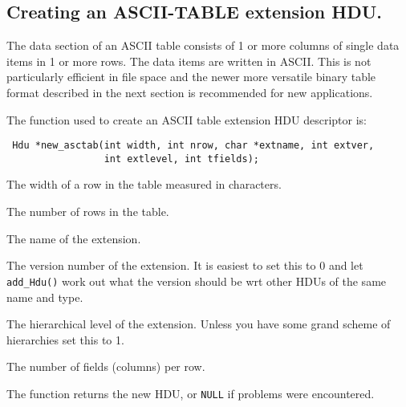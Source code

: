\subsection{Creating an ASCII-TABLE extension HDU.}

The data section of an ASCII table consists of 1 or more columns of
single data items in 1 or more rows. The data items are written in
ASCII. This is not particularly efficient in file space and the newer
more versatile binary table format described in the next section is
recommended for new applications.

The function used to create an ASCII table extension HDU descriptor is:
\label{new_asctab}\begin{verbatim}
 Hdu *new_asctab(int width, int nrow, char *extname, int extver,
                 int extlevel, int tfields);
\end{verbatim}
\begin{arglist}

 The width of a row in the table measured in characters.

 The number of rows in the table.

 The name of the extension.

 The version number of the extension. It is easiest to set
            this to 0 and let \verb`add_Hdu()` work out what the version
            should be wrt other HDUs of the same name and type.

 The hierarchical level of the extension. Unless you have
            some grand scheme of hierarchies set this to 1.

 The number of fields (columns) per row.
\end{arglist}

The function returns the new HDU, or \verb`NULL` if problems were encountered.

